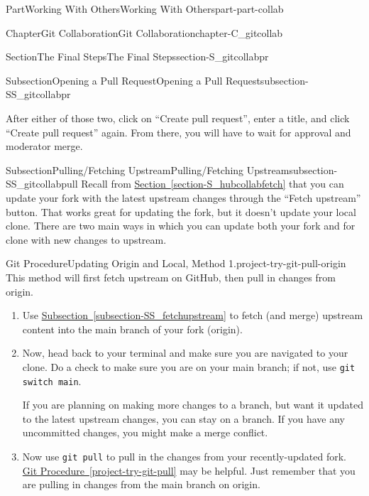 \documentclass[oneside,10pt,]{book}
\newcommand{\xreffont}{\relax}
\newcommand{\mono}[1]{\texttt{#1}}
\begin{document}
\begin{partptx}{Part}{Working With Others}{}{Working With Others}{}{}{part-part-collab}
\begin{chapterptx}{Chapter}{Git Collaboration}{}{Git Collaboration}{}{}{chapter-C_gitcollab}
\begin{sectionptx}{Section}{The Final Steps}{}{The Final Steps}{}{}{section-S_gitcollabpr}
\begin{subsectionptx}{Subsection}{Opening a Pull Request}{}{Opening a Pull Request}{}{}{subsection-SS_gitcollabpr}
\begin{enumerate}
\end{enumerate}
%
\par
After either of those two, click on ``Create pull request'', enter a title, and click ``Create pull request'' again. From there, you will have to wait for approval and moderator merge.%
\end{subsectionptx}
%
%
\typeout{************************************************}
\typeout{************************************************}
%
\begin{subsectionptx}{Subsection}{Pulling\slash{}Fetching Upstream}{}{Pulling\slash{}Fetching Upstream}{}{}{subsection-SS_gitcollabpull}
%
%
%
%
%
Recall from \hyperref[section-S_hubcollabfetch]{Section~{\xreffont\ref{section-S_hubcollabfetch}}} that you can update your fork with the latest upstream changes through the ``Fetch upstream'' button. That works great for updating the fork, but it doesn't update your local clone. There are two main ways in which you can update both your fork and for clone with new changes to upstream.%
\begin{project}{Git Procedure}{Updating Origin and Local, Method 1.}{project-try-git-pull-origin}%
%
%
%
%
This method will first fetch upstream on GitHub, then pull in changes from origin.%
\begin{enumerate}[font=\bfseries,label=(\alph*),ref=\alph*]%
\item{}Use \hyperref[subsection-SS_fetchupstream]{Subsection~{\xreffont\ref{subsection-SS_fetchupstream}}} to fetch (and merge) upstream content into the main branch of your fork (origin).%
\item{}Now, head back to your terminal and make sure you are navigated to your clone. Do a check to make sure you are on your main branch; if not, use \mono{git switch main}.%
\par
If you are planning on making more changes to a branch, but want it updated to the latest upstream changes, you can stay on a branch. If you have any uncommitted changes, you might make a merge conflict.%
\item{}Now use \mono{git pull} to pull in the changes from your recently-updated fork. \hyperref[project-try-git-pull]{Git Procedure~{\xreffont\ref{project-try-git-pull}}} may be helpful. Just remember that you are pulling in changes from the main branch on origin.%
\end{enumerate}%

\end{project}
\end{subsectionptx}
\end{sectionptx}
\end{chapterptx}
\end{partptx}
\end{document}
